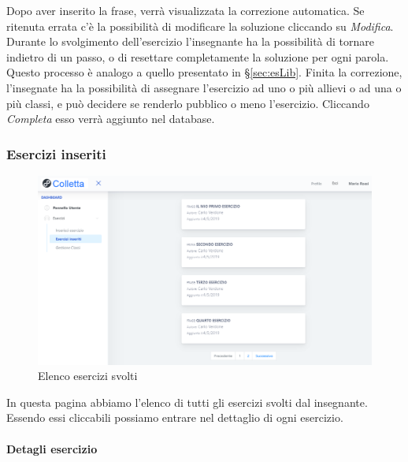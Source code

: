           Dopo aver inserito la frase, verrà visualizzata la correzione automatica. Se ritenuta errata c'è la possibilità di modificare la soluzione cliccando su \textit{Modifica}. Durante lo svolgimento dell'esercizio l'insegnante ha la possibilità di tornare indietro di un passo, o di resettare completamente la soluzione per ogni parola. Questo processo è analogo a quello presentato in \S\ref{sec:esLib}. Finita la correzione, l'insegnate ha la possibilità di assegnare l'esercizio ad uno o più allievi o ad una o più classi, e può decidere se renderlo pubblico o meno l'esercizio. Cliccando \textit{Completa} esso verrà aggiunto nel database.
\subsubsection{Esercizi inseriti}
\begin{figure}[H]
            	\centering
        		\includegraphics[width=17cm]{sez/img/insegnante/eserinseriti.PNG} 
            	\caption{Elenco esercizi svolti}\label{fig:1}
        	\end{figure}  
        	In questa pagina abbiamo l'elenco di tutti gli esercizi svolti dal insegnante. Essendo essi cliccabili possiamo entrare nel dettaglio di ogni esercizio.               
\newpage
\paragraph{Detagli esercizio}\mbox{}\\   


